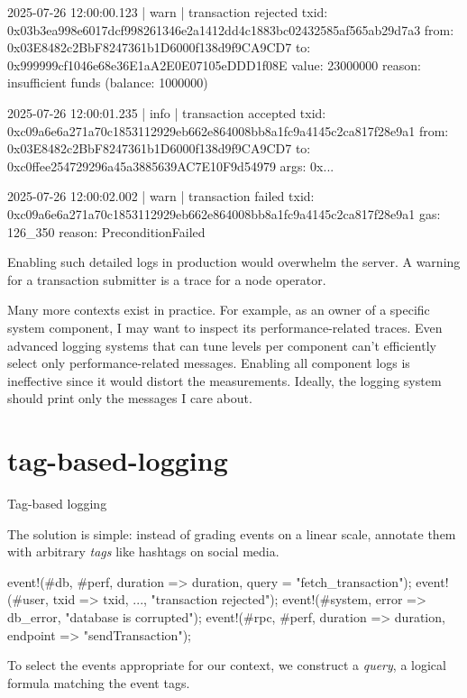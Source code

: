 \documentclass{article}
\begin{document}
\begin{code}
2025-07-26 12:00:00.123 |  warn | transaction rejected
    txid:   0x03b3ea998e6017dcf998261346e2a1412dd4c1883bc02432585af565ab29d7a3
    from:   0x03E8482c2BbF8247361b1D6000f138d9f9CA9CD7
      to:   0x999999cf1046e68e36E1aA2E0E07105eDDD1f08E
    value:  23000000
    reason: insufficient funds (balance: 1000000)

2025-07-26 12:00:01.235 |  info | transaction accepted
    txid: 0xc09a6e6a271a70c1853112929eb662e864008bb8a1fc9a4145c2ca817f28e9a1
    from: 0x03E8482c2BbF8247361b1D6000f138d9f9CA9CD7
      to: 0xc0ffee254729296a45a3885639AC7E10F9d54979
    args: 0x...

2025-07-26 12:00:02.002 |  warn | transaction failed
    txid:   0xc09a6e6a271a70c1853112929eb662e864008bb8a1fc9a4145c2ca817f28e9a1
    gas:    126_350
    reason: PreconditionFailed
\end{code}

Enabling such detailed logs in production would overwhelm the server.
A warning for a transaction submitter is a trace for a node operator.

Many more contexts exist in practice.
For example, as an owner of a specific system component,
I may want to inspect its performance-related traces.
Even advanced logging systems that can tune levels per component can't efficiently select only performance-related messages.
Enabling all component logs is ineffective since it would distort the measurements.
Ideally, the logging system should print only the messages I care about.

\section{tag-based-logging}{Tag-based logging}

The solution is simple: instead of grading events on a linear scale,
annotate them with arbitrary \emph{tags} like hashtags on social media.

\begin{code}
event!(#db, #perf, duration => duration, query = "fetch_transaction");
\cdots
event!(#user, txid => txid, ..., "transaction rejected");
\cdots
event!(#system, error => db_error, "database is corrupted");
\cdots
event!(#rpc, #perf, duration => duration, endpoint => "sendTransaction");
\end{code}

To select the events appropriate for our context, we construct a \emph{query},
a logical formula matching the event tags.
\end{document}
